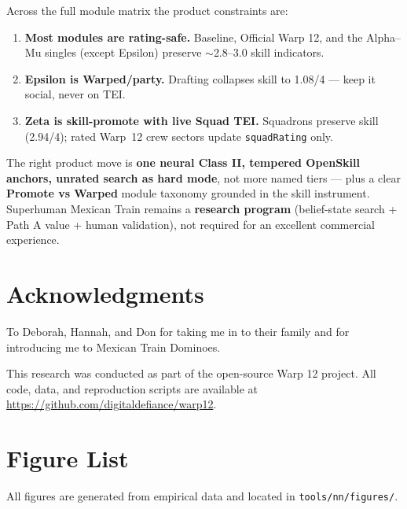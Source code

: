 \documentclass[11pt,letterpaper]{article}
\begin{document}
Across the full module matrix the product constraints are:

\begin{enumerate}
\item \textbf{Most modules are rating-safe.} Baseline, Official Warp 12, and the Alpha--Mu singles (except Epsilon) preserve $\sim$2.8--3.0 skill indicators.
\item \textbf{Epsilon is Warped/party.} Drafting collapses skill to 1.08/4 --- keep it social, never on TEI.
\item \textbf{Zeta is skill-promote with live Squad TEI.} Squadrons preserve skill (2.94/4); rated Warp~12 crew sectors update \texttt{squadRating} only.
\end{enumerate}

The right product move is \textbf{one neural Class II, tempered OpenSkill anchors, unrated search as hard mode}, not more named tiers --- plus a clear \textbf{Promote vs Warped} module taxonomy grounded in the skill instrument. Superhuman Mexican Train remains a \textbf{research program} (belief-state search + Path A value + human validation), not required for an excellent commercial experience.

\section*{Acknowledgments}

To Deborah, Hannah, and Don for taking me in to their family and for introducing me to Mexican Train Dominoes.

This research was conducted as part of the open-source Warp 12 project. All code, data, 
and reproduction scripts are available at 
\url{https://github.com/digitaldefiance/warp12}.

\appendix

\section{Figure List}

All figures are generated from empirical data and located in \texttt{tools/nn/figures/}.
\end{document}
